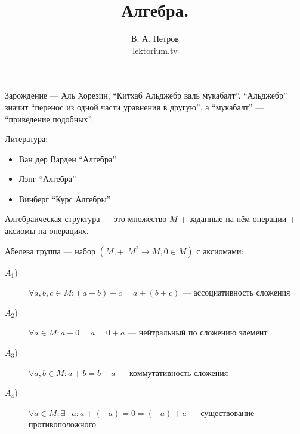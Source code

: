 \documentclass[12pt,a4paper]{article}
\title{Алгебра. %
}
\author{В. А. Петров\\lektorium.tv}
\date{}
\begin{document}
    \maketitle

    Зарождение --- Аль Хорезин, ``Китхаб Альджебр валь мукабалт''. ``Альджебр'' значит ``перенос из одной части уравнения в другую'', а ``мукабалт'' --- ``приведение подобных''.

    Литература:
    \begin{itemize}
        \item Ван дер Варден ``Алгебра''
        \item Лэнг ``Алгебра''
        \item Винберг ``Курс Алгебры''
    \end{itemize}

    \begin{definition}
        Алгебраическая структура --- это множество $M$ + заданные на нём операции + аксиомы на операциях.
    \end{definition}

    \begin{definition}
        Абелева группа --- набор $(M, +: M^2 \to M, 0 \in M)$ с аксиомами:
        \begin{description}
            \item[$A_1$)] $\forall a, b, c \in M: (a + b) + c = a + (b + c)$ --- ассоциативность сложения
            \item[$A_2$)] $\forall a \in M: a + 0 = a = 0 + a$ --- нейтральный по сложению элемент
            \item[$A_3$)] $\forall a, b \in M: a + b = b + a$ --- коммутативность сложения
            \item[$A_4$)] $\forall a \in M: \exists -a: a + (-a) = 0 = (-a) + a$ --- существование противоположного
        \end{description}
    \end{definition}
\end{document}
